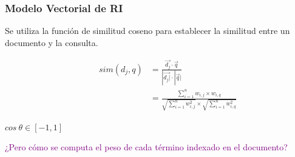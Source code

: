 \documentclass[
10pt, %
aspectratio=169, %
]{beamer}
\begin{document}
	\begin{frame}
		
		\frametitle{Modelo Vectorial de RI}
		
		Se utiliza la función de similitud coseno para establecer la similitud entre un documento y la consulta.
		
		\begin{minipage}{.4\textwidth}
			
			\begin{align*}
				\hspace{1cm} sim(d_j, q) &= \frac{\overrightarrow{d_j} \cdot \overrightarrow{q}}{|\overrightarrow{d_j|} \cdot |\overrightarrow{q}|} \\
				 &= \frac{\sum_{i=1}^{n} w_{i, j} \times w_{i, q}}{\sqrt{\sum_{i=1}^{n} w_{i, j}^2} \times \sqrt{\sum_{i=1}^{n} w_{i, q}^2}}
			\end{align*}
			
		\end{minipage}%
		\begin{minipage}{.7\textwidth}
		
			\vspace{1\baselineskip}
			\centering
			
			$cos \ \theta \in [-1, 1]$
			
		\end{minipage}
		
		\pause
		\vspace{3\baselineskip}
		\textcolor{purple}{¿Pero cómo se computa el peso de cada término indexado en el documento?}
		
	\end{frame}
	
\end{document}
